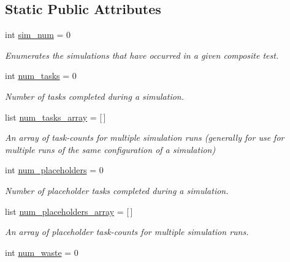 \subsection*{Static Public Attributes}
\begin{DoxyCompactItemize}
\item 
int \mbox{\hyperlink{classdynamicfilterapp_1_1test__simulations_1_1_simulation_test_a85a91fb88baf5a119ab7c5cddf9006ae}{sim\+\_\+num}} = 0
\begin{DoxyCompactList}\small\item\em Enumerates the simulations that have occurred in a given composite test. \end{DoxyCompactList}\item 
int \mbox{\hyperlink{classdynamicfilterapp_1_1test__simulations_1_1_simulation_test_acabb76141a8e1b125551bab4cc352cf3}{num\+\_\+tasks}} = 0
\begin{DoxyCompactList}\small\item\em Number of tasks completed during a simulation. \end{DoxyCompactList}\item 
list \mbox{\hyperlink{classdynamicfilterapp_1_1test__simulations_1_1_simulation_test_a9a711b14b6afd224c385343d7b1d2c28}{num\+\_\+tasks\+\_\+array}} = \mbox{[}$\,$\mbox{]}
\begin{DoxyCompactList}\small\item\em An array of task-\/counts for multiple simulation runs (generally for use for multiple runs of the same configuration of a simulation) \end{DoxyCompactList}\item 
int \mbox{\hyperlink{classdynamicfilterapp_1_1test__simulations_1_1_simulation_test_ae67ea06fd676feeaac67e3d95c5649d3}{num\+\_\+placeholders}} = 0
\begin{DoxyCompactList}\small\item\em Number of placeholder tasks completed during a simulation. \end{DoxyCompactList}\item 
list \mbox{\hyperlink{classdynamicfilterapp_1_1test__simulations_1_1_simulation_test_a55d26b5f7261b447d97cf30b9714808c}{num\+\_\+placeholders\+\_\+array}} = \mbox{[}$\,$\mbox{]}
\begin{DoxyCompactList}\small\item\em An array of placeholder task-\/counts for multiple simulation runs. \end{DoxyCompactList}\item 
int \mbox{\hyperlink{classdynamicfilterapp_1_1test__simulations_1_1_simulation_test_a6a47bd243e0af8b779e6639e880eb81c}{num\+\_\+waste}} = 0

\end{DoxyCompactItemize}
